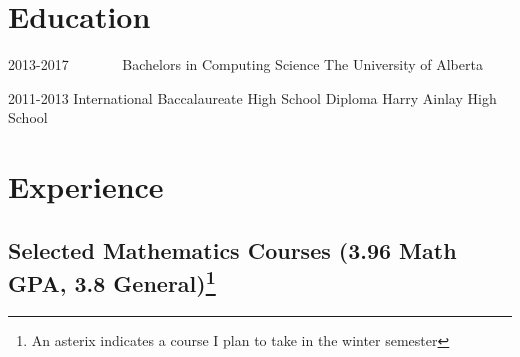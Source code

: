 \documentclass{friggeri-cv} %
\begin{document}

\section{Education}

\begin{entrylist}


\entry
{2013-2017\ \ \ \ \ \ \ }
{Bachelors {\normalfont in Computing Science}}
{The University of Alberta}


\entry
{2011-2013}
{International Baccalaureate {\normalfont High School Diploma}}
{Harry Ainlay High School}


\end{entrylist}


\pagebreak[4]
\section{Experience}

\subsection{Selected Mathematics Courses (3.96 Math GPA, 3.8 General)\footnote{An asterix indicates a course I plan to take in the winter semester}}
\end{document}
